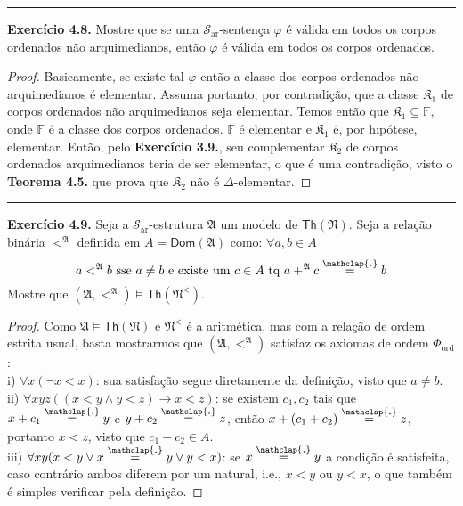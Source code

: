 \documentclass[11pt]{article}
\newcommand{\mc}[1]{\mathcal{#1}}
\newcommand{\mf}[1]{\mathfrak{#1}}
\newcommand{\msf}[1]{\mathsf{#1}}
\newcommand{\mbb}[1]{\mathbb{#1}}
\newcommand\overtext[2]{\stackrel{\mathclap{\normalfont\mbox{#1}}}{#2}}
\begin{document}
\hrule

\begin{shaded}
\textbf{Exercício 4.8.} Mostre que se uma $\mc{S}_\text{ar}$-sentença $\varphi$ é válida em todos os corpos ordenados não arquimedianos, então $\varphi$ é válida em todos os corpos ordenados.
\end{shaded}

\begin{proof}
    Basicamente, se existe tal $\varphi$ então a classe dos corpos ordenados não-arquimedianos é elementar. Assuma portanto, por contradição, que a classe $\mf{K}_1$ de corpos ordenados não arquimedianos seja elementar. Temos então que $\mf{K}_1\subseteq\mbb{F}$, onde $\mbb{F}$ é a classe dos corpos ordenados. $\mbb{F}$ é elementar e $\mf{K}_1$ é, por hipótese, elementar. Então, pelo \textbf{Exercício 3.9.}, seu complementar $\mf{K}_2$ de corpos ordenados arquimedianos teria de ser elementar, o que é uma contradição, visto o \textbf{Teorema 4.5.} que prova que $\mf{K}_2$ não é $\Delta$-elementar.
\end{proof}

\hrule

\begin{shaded}
\textbf{Exercício 4.9.} Seja a $\mc{S}_\text{ar}$-estrutura $\mf{A}$ um modelo de $\msf{Th}(\mf{N})$. Seja a relação binária $<^\mf{A}$ definida em $A=\msf{Dom}(\mf{A})$ como: $\forall a,b\in A$
$$a<^\mf{A}b\text{ sse }a\ne b\text{ e existe um }c\in A\text{ tq }a+^\mf{A}c\overtext{.}{=}b$$
Mostre que $(\mf{A},<^\mf{A})\vDash\msf{Th}(\mf{N}^<)$.
\end{shaded}

\begin{proof}
    Como $\mf{A}\vDash\msf{Th}(\mf{N})$ e $\mf{N}^<$ é a aritmética, mas com a relação de ordem estrita usual, basta mostrarmos que $(\mf{A}, <^\mf{A})$ satisfaz os axiomas de ordem $\Phi_\text{ord}$:\\
    i) $\forall x(\neg x<x)$: sua satisfação segue diretamente da definição, visto que $a\ne b$.\\
    ii) $\forall xyz((x<y\wedge y<z)\rightarrow x<z)$: se existem $c_1,c_2$ tais que $x+c_1\overtext{.}{=}y$ e $y+c_2\overtext{.}{=}z$, então $x+(c_1+c_2)\overtext{.}{=}z$, portanto $x < z$, visto que $c_1+c_2\in A$.\\
    iii) $\forall xy(x<y\vee x\overtext{.}{=}y\vee y<x)$: se $x\overtext{.}{=}y$ a condição é satisfeita, caso contrário ambos diferem por um natural, i.e., $x<y$ ou $y<x$, o que também é simples verificar pela definição.
\end{proof}
\end{document}
